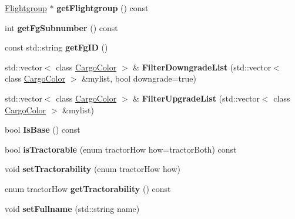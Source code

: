\begin{DoxyCompactItemize}
\item 
\hyperlink{classFlightgroup}{Flightgroup} $\ast$ {\bfseries get\+Flightgroup} () const \hypertarget{classUnit_ad9be7e5f1502b58a2a9677245c786a14}{}\label{classUnit_ad9be7e5f1502b58a2a9677245c786a14}

\item 
int {\bfseries get\+Fg\+Subnumber} () const \hypertarget{classUnit_a26711c8d8d2e372d5bb6cd02e099bc49}{}\label{classUnit_a26711c8d8d2e372d5bb6cd02e099bc49}

\item 
const std\+::string {\bfseries get\+Fg\+ID} ()\hypertarget{classUnit_adcf663cdfa47945703a96de8ae8a6bba}{}\label{classUnit_adcf663cdfa47945703a96de8ae8a6bba}

\item 
std\+::vector$<$ class \hyperlink{classCargoColor}{Cargo\+Color} $>$ \& {\bfseries Filter\+Downgrade\+List} (std\+::vector$<$ class \hyperlink{classCargoColor}{Cargo\+Color} $>$ \&mylist, bool downgrade=true)\hypertarget{classUnit_abb191f45e1b7628d65ecb83bf8f10a84}{}\label{classUnit_abb191f45e1b7628d65ecb83bf8f10a84}

\item 
std\+::vector$<$ class \hyperlink{classCargoColor}{Cargo\+Color} $>$ \& {\bfseries Filter\+Upgrade\+List} (std\+::vector$<$ class \hyperlink{classCargoColor}{Cargo\+Color} $>$ \&mylist)\hypertarget{classUnit_acdaf1af0aff675c5ec67cd04039c7ec6}{}\label{classUnit_acdaf1af0aff675c5ec67cd04039c7ec6}

\item 
bool {\bfseries Is\+Base} () const \hypertarget{classUnit_a9d46c33b6b84f6ed2f8c8f3ea926b9f5}{}\label{classUnit_a9d46c33b6b84f6ed2f8c8f3ea926b9f5}

\item 
bool {\bfseries is\+Tractorable} (enum tractor\+How how=tractor\+Both) const \hypertarget{classUnit_a509c5b9eaa4f8f8e24ac6e24076b442a}{}\label{classUnit_a509c5b9eaa4f8f8e24ac6e24076b442a}

\item 
void {\bfseries set\+Tractorability} (enum tractor\+How how)\hypertarget{classUnit_ae53431b2f8cba99609994daf8d49b2e7}{}\label{classUnit_ae53431b2f8cba99609994daf8d49b2e7}

\item 
enum tractor\+How {\bfseries get\+Tractorability} () const \hypertarget{classUnit_af42dfa2ac4a18a34e6e14699d2e80228}{}\label{classUnit_af42dfa2ac4a18a34e6e14699d2e80228}

\item 
void {\bfseries set\+Fullname} (std\+::string name)\hypertarget{classUnit_ac413c791b4014d16c45d3f640c7cf501}{}\label{classUnit_ac413c791b4014d16c45d3f640c7cf501}


\end{DoxyCompactItemize}
